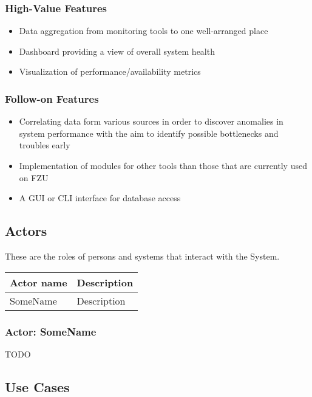\documentclass[12pt]{article}
\begin{document}
\subsubsection{High-Value Features}
\begin{itemize}
	\item Data aggregation from monitoring tools to one well-arranged place
    \item Dashboard providing a view of overall system health
    \item Visualization of performance/availability metrics
\end{itemize}

\subsubsection{Follow-on Features}
\begin{itemize}
    \item Correlating data form various sources in order to discover anomalies
        in system performance with the aim to identify possible bottlenecks and
        troubles early
	\item Implementation of modules for other tools than those that are currently used on FZU
    \item A GUI or CLI interface for database access
\end{itemize}

\subsection{Actors}
These are the roles of persons and systems that interact with the System.

\begin{table}[!h]
	\begin{tabular}{| l | l |}
		\hline
		\textbf{Actor name}		& \textbf{Description}\\
		\hline
		SomeName	& Description\\
		\hline
	\end{tabular}
	\label{tab:Actors}
\end{table}

\subsubsection{Actor: SomeName}
TODO

\subsection{Use Cases}
\end{document}

